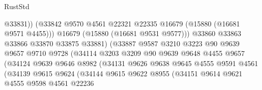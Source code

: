 \begin{lexlean}{RustStd}
\begin{coremodule}
                                        @33831))
                                    (@33842
                                      @9570
                                      @4561
                                      @22321
                                      @22335
                                      @16679
                                      (@15880 (@16681 @9571 @4455)))
                                    @16679
                                    (@15880 (@16681 @9531 @9577)))
                                  @33860
                                  @33863
                                  @33866
                                  @33870
                                  @33875
                                  @33881)
                                (@33887
                                  @9587
                                  @3210
                                  @3223
                                  @90
                                  @9639
                                  @9657
                                  @9710
                                  @9728
                                  (@34114
                                    @3203
                                    @3209
                                    @90
                                    @9639
                                    @9648
                                    @4455
                                    @9657
                                    (@34124
                                      @9639
                                      @9646
                                      @8982
                                      (@34131
                                        @9626
                                        @9638
                                        @9645
                                        @4555
                                        @9591
                                        @4561
                                        (@34139
                                          @9615
                                          @9624
                                          (@34144
                                            @9615
                                            @9622
                                            @8955
                                            (@34151
                                              @9614
                                              @9621
                                              @4555
                                              @9598
                                              @4561
                                              @22236

\end{coremodule}
\end{lexlean}
